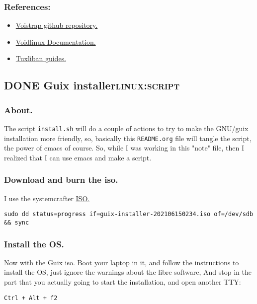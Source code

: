 \documentclass[11pt]{article}
\begin{document}
\subsubsection{References:}
\label{sec:org09b3ed0}
\begin{itemize}
\item \href{https://github.com/jpachecoxyz/voidstrap}{Voistrap github repository.}
\item \href{https://docs.voidlinux.org/}{Voidlinux Documentation.}
\item \href{https://git.disroot.org/tuxliban/tutoriales\_void/src/branch/master/Gu\%C3\%ADas}{Tuxliban guides.}
\end{itemize}
\subsection{{\bfseries\sffamily DONE} Guix installer\hfill{}\textsc{linux:script}}
\label{sec:org47bbe83}
\subsubsection{About.}
\label{sec:org274a954}
The script \texttt{install.sh} will do a couple of actions to try to make the GNU/guix installation more friendly, so, basically this \texttt{README.org} file will tangle the script, the power of emacs of course. So, while I was working in this "note" file, then I realized that I can use emacs and make a script.
\subsubsection{Download and burn the iso.}
\label{sec:org726c668}
I use the systemcrafter \href{https://github.com/SystemCrafters/guix-installer}{ISO.}

\begin{verbatim}
sudo dd status=progress if=guix-installer-202106150234.iso of=/dev/sdb && sync
\end{verbatim}
\subsubsection{Install the OS.}
\label{sec:orgde78793}
Now with the Guix iso. Boot your laptop in it, and follow the instructions to install the OS, just ignore the warnings about the libre software, And stop in the part that you actually going to start the installation, and open another TTY:

\begin{verbatim}
Ctrl + Alt + f2  
\end{verbatim}
\end{document}
